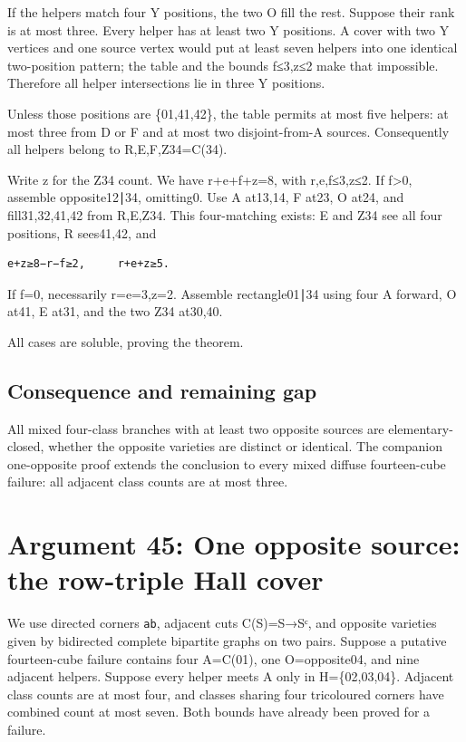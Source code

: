 \documentclass[
  10pt,
]{article}
\begin{document}
If the helpers match four Y positions, the two O fill the rest. Suppose
their rank is at most three. Every helper has at least two Y positions.
A cover with two Y vertices and one source vertex would put at least
seven helpers into one identical two-position pattern; the table and the
bounds f≤3,z≤2 make that impossible. Therefore all helper intersections
lie in three Y positions.

Unless those positions are \{01,41,42\}, the table permits at most five
helpers: at most three from D or F and at most two disjoint-from-A
sources. Consequently all helpers belong to R,E,F,Z34=C(34).

Write z for the Z34 count. We have r+e+f+z=8, with r,e,f≤3,z≤2. If
f\textgreater0, assemble opposite12∣34, omitting0. Use A at13,14, F
at23, O at24, and fill31,32,41,42 from R,E,Z34. This four-matching
exists: E and Z34 see all four positions, R sees41,42, and

\begin{verbatim}
e+z≥8−r−f≥2,     r+e+z≥5.
\end{verbatim}

If f=0, necessarily r=e=3,z=2. Assemble rectangle01∣34 using four A
forward, O at41, E at31, and the two Z34 at30,40.

All cases are soluble, proving the theorem.

\hypertarget{consequence-and-remaining-gap}{%
\subsection*{Consequence and remaining
gap}\label{consequence-and-remaining-gap}}

All mixed four-class branches with at least two opposite sources are
elementary-closed, whether the opposite varieties are distinct or
identical. The companion one-opposite proof extends the conclusion to
every mixed diffuse fourteen-cube failure: all adjacent class counts are
at most three.

\hypertarget{arg-45}{%
\section{Argument 45: One opposite source: the row-triple Hall
cover}\label{arg-45}}

We use directed corners \texttt{ab}, adjacent cuts C(S)=S→Sᶜ, and
opposite varieties given by bidirected complete bipartite graphs on two
pairs. Suppose a putative fourteen-cube failure contains four A=C(01),
one O=opposite04, and nine adjacent helpers. Suppose every
helper meets A only in H=\{02,03,04\}. Adjacent class counts are at most
four, and classes sharing four tricoloured corners have combined count
at most seven. Both bounds have already been proved for a failure.
\end{document}
